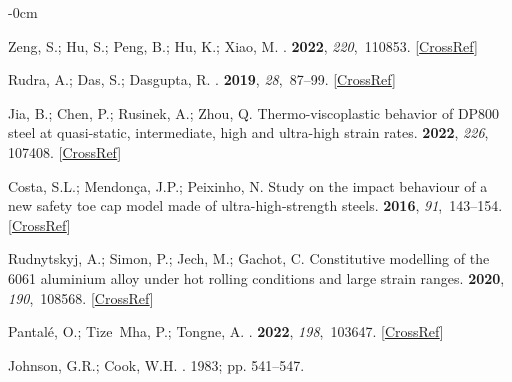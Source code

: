 \documentclass[metals,article,accept,pdftex,moreauthors]{Definitions/mdpi}
\begin{document}
\begin{adjustwidth}{-\extralength}{0cm}
\begin{thebibliography}{999}
Zeng, S.; Hu, S.; Peng, B.; Hu, K.; Xiao, M.
.
 {\bf 2022}, {\em 220},~110853. [\href{http://dx.doi.org/10.1016/j.matdes.2022.110853}{CrossRef}]

Rudra, A.; Das, S.; Dasgupta, R.
.
 {\bf 2019},
{\em 28},~87--99. [\href{http://dx.doi.org/10.1007/s11665-018-3813-9}{CrossRef}]

Jia, B.; Chen, P.; Rusinek, A.; Zhou, Q.
\newblock Thermo-viscoplastic behavior of DP800 steel at quasi-static,
intermediate, high and ultra-high strain rates.
 {\bf 2022}, {\emph{226}},
107408. [\href{http://dx.doi.org/10.1016/j.ijmecsci.2022.107408}{CrossRef}]

Costa, S.L.; Mendon{\c{c}}a, J.P.; Peixinho, N.
\newblock Study on the impact behaviour of a new safety toe cap model made of
ultra-high-strength steels.
 {\bf 2016}, {\em 91},~143--154. [\href{http://dx.doi.org/10.1016/j.matdes.2015.11.082}{CrossRef}]

{Rudnytskyj, A.; Simon, P.; Jech, M.; Gachot, C.} 
\newblock Constitutive modelling of the 6061 aluminium alloy under hot rolling
conditions and large strain ranges.
 {\bf 2020}, {\em 190},~108568. [\href{http://dx.doi.org/10.1016/j.matdes.2020.108568}{CrossRef}]

Pantalé, O.; Tize~Mha, P.; Tongne, A.
.
 {\bf 2022}, {\em
198},~103647. [\href{http://dx.doi.org/10.1016/j.finel.2021.103647}{CrossRef}]

Johnson, G.R.; Cook, W.H.
.
 {1983}; {pp. 541--547}.


\end{thebibliography}
\end{adjustwidth}
\end{document}
